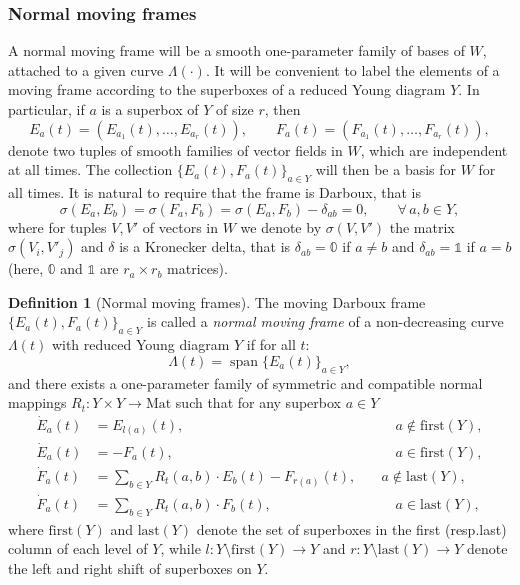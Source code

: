 \documentclass[11pt,a4paper]{article}
\theoremstyle{plain}
\theoremstyle{definition}
\newtheorem{definition}[theorem]{Definition}
\theoremstyle{remark}
\numberwithin{equation}{section}
\DeclareMathOperator{\spn}{\mathrm{span}}
\begin{document}
\subsubsection{Normal moving frames}

A normal moving frame will be a smooth one-parameter family of bases of $W$, attached to a given curve $\Lambda(\cdot)$. It will be convenient to label the elements of a moving frame according to the superboxes of a reduced Young diagram $Y$. In particular, if $a$ is a superbox of $Y$ of size $r$, then
\begin{equation}
E_a(t) = (E_{a_1}(t),\dots,E_{a_r}(t)), \qquad F_a(t) = (F_{a_1}(t),\dots,F_{a_r}(t)),
\end{equation}
denote two tuples of smooth families of vector fields in $W$, which are independent at all times. The collection $\{E_a(t),F_a(t)\}_{a \in Y}$ will then be a basis for $W$ for all times. It is natural to require that the frame is Darboux, that is
\begin{equation}\label{eq:Darboux}
\sigma(E_a,E_b) = \sigma(F_a,F_b) = \sigma(E_a,F_b)-\delta_{ab} = 0,\qquad \forall\, a,b\in Y,
\end{equation}
where for tuples $V,V'$ of vectors in $W$ we denote by $\sigma(V,V')$ the matrix $\sigma(V_i,V'_j)$ and $\delta$ is a Kronecker delta, that is $\delta_{ab} = \mathbb{0}$ if $a\neq b$ and $\delta_{ab} = \mathbb{1}$ if $a=b$ (here, $\mathbb{0}$ and $\mathbb{1}$ are $r_a\times r_b$ matrices).


\begin{definition}[Normal moving frames]\label{def:normalframe}
The moving Darboux frame $\{E_a(t),F_a(t)\}_{a\in Y}$ is called a \emph{normal moving frame} of a non-decreasing curve $\Lambda(t)$ with reduced Young diagram $Y$ if for all $t$:
\begin{equation}\label{eq:attached}
\Lambda(t) = \spn\{E_a(t)\}_{a\in Y},
\end{equation}
and there exists a one-parameter family of symmetric and compatible normal mappings $R_t: Y\times Y\to \mathrm{Mat}$ such that for any superbox $a\in Y$
\begin{align}
\dot{E}_a(t) & = E_{l(a)}(t),	& \qquad a\notin\mathrm{first}(Y),\\
\dot{E}_a(t) & = -F_a(t), 			& \qquad a\in \mathrm{first}(Y),\\
\dot{F}_a(t) & = \sum_{b\in Y} R_t(a,b) \cdot E_b(t) - F_{r(a)}(t), 	& \quad a \notin\mathrm{last}(Y), \\
\dot{F}_a(t) & = \sum_{b\in Y}R_t(a,b) \cdot F_b(t), & \qquad a\in\mathrm{last}(Y),
\end{align}
where $\mathrm{first}(Y)$ and $\mathrm{last}(Y)$ denote the set of superboxes in the first (resp.\@ last) column of each level of $Y$, while $l : Y\setminus \mathrm{first}(Y) \to Y$ and $r:Y\setminus \mathrm{last}(Y)\to Y$ denote the left and right shift of superboxes on $Y$.
\end{definition}
\end{document}
